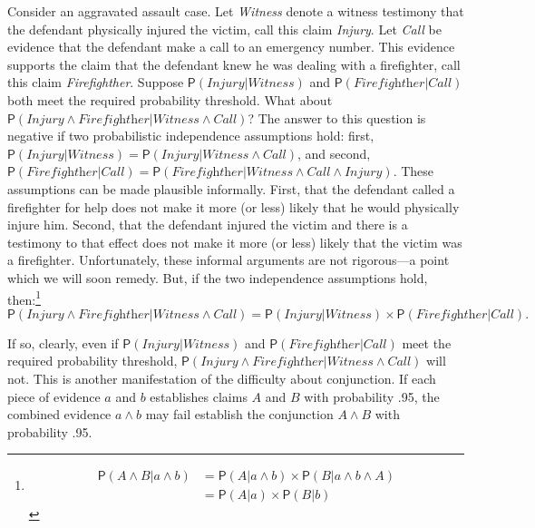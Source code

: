 \documentclass[
  10pt,
  dvipsnames,enabledeprecatedfontcommands]{scrartcl}
\newcommand{\et}{\wedge}
\newcommand{\pr}[1]{\mathsf{P}(#1)}
\begin{document}
Consider an aggravated assault case. Let \textit{Witness} denote a
witness testimony that the defendant physically injured the victim, call
this claim \textit{Injury}. Let \textit{Call} be evidence that the
defendant make a call to an emergency number. This evidence supports the
claim that the defendant knew he was dealing with a firefighter, call
this claim \textit{Firefighther}. Suppose
\(\pr{\textit{Injury} \vert \textit{Witness}}\) and
\(\pr{\textit{Firefighther} \vert \textit{Call} }\) both meet the
required probability threshold. What about
\(\pr{\textit{Injury} \wedge \textit{Firefighther} \vert \textit{Witness} \wedge \textit{Call}}\)?
The answer to this question is negative if two probabilistic
independence assumptions hold: first,
\(\pr{\textit{Injury} \vert \textit{Witness}}=\pr{\textit{Injury} \vert \textit{Witness} \wedge \textit{Call}}\),
and
second,\(\pr{\textit{Firefighther} \vert \textit{Call} }=\pr{\textit{Firefighther} \vert \textit{Witness} \wedge \textit{Call} \wedge \textit{Injury}}\).
These assumptions can be made plausible informally. First, that the
defendant called a firefighter for help does not make it more (or less)
likely that he would physically injure him. Second, that the defendant
injured the victim and there is a testimony to that effect does not make
it more (or less) likely that the victim was a firefighter.
Unfortunately, these informal arguments are not rigorous---a point which
we will soon remedy. But, if the two independence assumptions hold,
then:\footnote{ \begin{align*}
  \pr{A \wedge  B \vert a \wedge b}& =\pr{A \vert a \wedge b} \times \pr{B \vert  a \wedge b \wedge A}\\
   & = \pr{A \vert a} \times \pr{B \vert  b}
   \end{align*}}
\[\pr{\textit{Injury} \wedge \textit{Firefighther} \vert \textit{Witness} \wedge \textit{Call}}= \pr{\textit{Injury} \vert \textit{Witness}} \times \pr{\textit{Firefighther} \vert \textit{Call}}. \]

If so, clearly, even if \(\pr{\textit{Injury} \vert \textit{Witness}}\)
and \(\pr{\textit{Firefighther} \vert \textit{Call} }\) meet the
required probability threshold,
\(\pr{\textit{Injury} \wedge \textit{Firefighther} \vert \textit{Witness} \wedge \textit{Call}}\)
will not. This is another manifestation of the difficulty about
conjunction. If each piece of evidence \(a\) and \(b\) establishes
claims \(A\) and \(B\) with probability .95, the combined evidence
\(a\et b\) may fail establish the conjunction \(A\et B\) with
probability .95.
\end{document}
